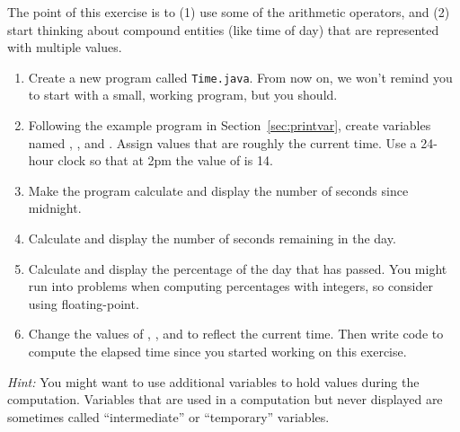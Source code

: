 \begin{exercise}  %

The point of this exercise is to (1) use some of the arithmetic operators, and (2) start thinking about compound entities (like time of day) that are represented with multiple values.

\begin{enumerate}

\item Create a new program called {\tt Time.java}.
From now on, we won't remind you to start with a small, working program, but you should.

\item Following the example program in Section~\ref{sec:printvar}, create variables named , , and .
Assign values that are roughly the current time.
Use a 24-hour clock so that at 2pm the value of  is 14.

\item Make the program calculate and display the number of seconds since midnight.

\item Calculate and display the number of seconds remaining in the day.

\item Calculate and display the percentage of the day that has passed.
You might run into problems when computing percentages with integers, so consider using floating-point.

\item Change the values of , , and  to reflect the current time.
Then write code to compute the elapsed time since you started working on this exercise.

\end{enumerate}

{\it Hint:} You might want to use additional variables to hold values during the computation.
Variables that are used in a computation but never displayed are sometimes called ``intermediate'' or ``temporary'' variables.

\end{exercise}
